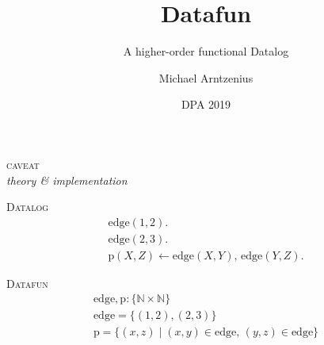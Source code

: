\documentclass[dvipsnames,fleqn]{beamer}
\title{Datafun}
\subtitle{A higher-order functional Datalog}
\author{Michael Arntzenius}
\institute{University of Birmingham}
\date{DPA 2019}
\providecommand\EMPH\textsc
\newcommand\kw\textbf
\newcommand\name\text
\newcommand\tset[1]{\{{#1}\}}
\newcommand\x\times
\newcommand\N{\mathbb{N}}
\newcommand\eset[1]{\{{#1}\}}
\newcommand\esetfor[2]{\eset{{#1} \mathrel{|} {#2}}}
\newcommand\efor[1]{\kw{for}\;{#1}\;\kw{do}\;}
\newcommand\ewhen[1]{\kw{when}\;{#1}\;\kw{do}\;}
\newcommand\shaded{\color{gray}}
\begin{document}
\maketitle

\Large

\begin{frame}{}
  \centering \huge
  \EMPH{caveat}
  \\[1ex]
  \emph{{\color{ForestGreen}theory} \& {\color{DarkOrchid}implementation}}
\end{frame}

\newcommand\whereami[1]{
\begin{frame}
  \centering
\end{frame}
}


\whereami{0}

\begin{frame}
  \EMPH{Datalog}
  \[
  \begin{array}{l}
    \name{edge}(1,2).\\\name{edge}(2,3).\\
    \name{p}(X,Z) \gets \name{edge}(X,Y),\, \name{edge}(Y,Z).
  \end{array}
  \]
  \vspace{0pt} %

  \EMPH{Datafun}
  \[
  \begin{array}{l}
    \name{edge}, \name{p} : \tset{\N \x \N}\\
    \name{edge} = \eset{(1,2), (2,3)}\\
    \name{p} =
    \esetfor{(x,z)}{(x,y) \in \name{edge},\, (y,z) \in \name{edge}}
  \end{array}
  \]
  \vspace{1em}
\end{frame}
\end{document}

